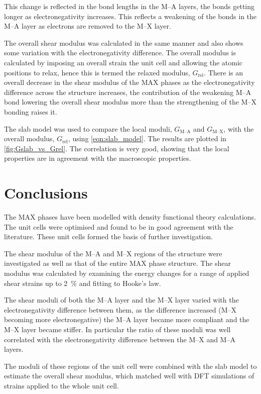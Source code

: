This change is reflected in the bond lengths in the M--A layers, the bonds getting longer as electronegativity increases. This reflects a weakening of the bonds in the M--A layer as electrons are removed to the M--X layer.




The overall shear modulus was calculated in the same manner and also shows some variation with the electronegativity difference. The overall modulus is calculated by imposing an overall strain the unit cell and allowing the atomic positions to relax, hence this is termed the relaxed modulus, $G_{\text{rel}}$. There is an overall decrease in the shear modulus of the MAX phases as the electronegativity difference across the structure increases, the contribution of the weakening M--A bond lowering the overall shear modulus more than the strengthening of the M--X bonding raises it.


The slab model was used to compare the local moduli, $G_{\text{M--A}}$ and $G_{\text{M--X}}$,  with the overall modulus, $G_{\text{rel}}$, using \autoref{eqn:slab_model}. The results are plotted in \autoref{fig:Gslab_vs_Grel}. The correlation is very good, showing that the local properties are in agreement with the macroscopic properties.



\section{Conclusions}

The MAX phases have been modelled with density functional theory calculations. The unit cells were optimised and found to be in good agreement with the literature. These unit cells formed the basis of further investigation.

The shear modulus of the M--A and M--X regions of the structure were investigated as well as that of the entire MAX phase structure. The shear modulus was calculated by examining the energy changes for a range of applied shear strains up to \SI{2}{\percent} and fitting to Hooke's law.

The shear moduli of both the M--A layer and the M--X layer varied with the electronegativity difference between them, as the difference increased (M--X becoming more electronegative) the M--A layer became more compliant and the M--X layer became stiffer. In particular the ratio of these moduli was well correlated with the electronegativity difference between the M--X and M--A layers.

The moduli of these regions of the unit cell were combined with the slab model to estimate the overall shear modulus, which matched well with DFT simulations of strains applied to the whole unit cell.






























